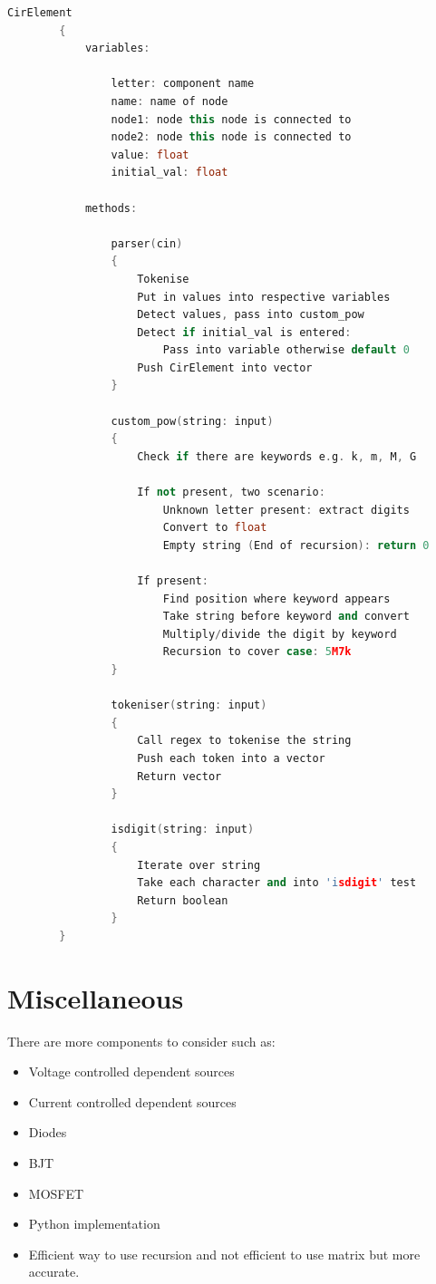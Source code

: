 \documentclass[a4paper, titlepage]{article}
\begin{document}
    \begin{lstlisting}[language=C++]
        CirElement 
        {
            variables:
    
                letter: component name
                name: name of node
                node1: node this node is connected to 
                node2: node this node is connected to
                value: float
                initial_val: float
    
            methods:
    
                parser(cin)
                {
                    Tokenise
                    Put in values into respective variables
                    Detect values, pass into custom_pow
                    Detect if initial_val is entered:
                        Pass into variable otherwise default 0
                    Push CirElement into vector
                }

                custom_pow(string: input)
                {
                    Check if there are keywords e.g. k, m, M, G
    
                    If not present, two scenario:
                        Unknown letter present: extract digits 
                        Convert to float
                        Empty string (End of recursion): return 0
    
                    If present:
                        Find position where keyword appears
                        Take string before keyword and convert
                        Multiply/divide the digit by keyword
                        Recursion to cover case: 5M7k
                }

                tokeniser(string: input)
                {
                    Call regex to tokenise the string 
                    Push each token into a vector 
                    Return vector
                }

                isdigit(string: input)
                {
                    Iterate over string
                    Take each character and into 'isdigit' test
                    Return boolean
                }
        }
    \end{lstlisting}

    \pagebreak
    \section{Miscellaneous}
    There are more components to consider such as:
    \begin{itemize}
        \item Voltage controlled dependent sources
        \item Current controlled dependent sources
        \item Diodes
        \item BJT
        \item MOSFET
        \item Python implementation
        \item Efficient way to use recursion and not efficient to use matrix but more accurate.
    \end{itemize}


    \pagebreak
    \printbibliography[title={References}]
\end{document}
